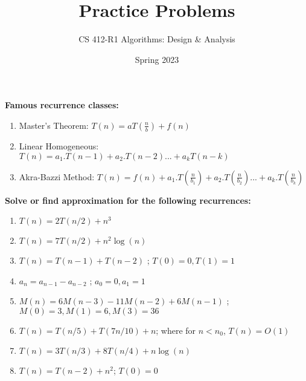 \documentclass{article}
\title{Practice Problems}
\author{CS 412-R1 Algorithms: Design \& Analysis}
\date{Spring 2023}
\begin{document}
\maketitle

\noindent \textbf{Famous recurrence classes:}
\begin{enumerate}
    \item Master's Theorem: $\displaystyle T(n) = aT\left(\frac{n}{b}\right) + f(n)$
    \item Linear Homogeneous: $T(n) = a_1.T(n-1)+a_2.T(n-2)...+a_kT(n-k)$
    \item Akra-Bazzi Method: $\displaystyle T(n) = f(n) + a_1.T\left(\frac{n}{b_1}\right) + a_2.T\left(\frac{n}{b_2}\right)... + a_k.T\left(\frac{n}{b_k}\right)$
\end{enumerate}


\noindent \textbf{Solve or find approximation for the following recurrences:}
\begin{enumerate}
    \item $T(n) = 2T(n/2) + n^3$
    \item $T(n) = 7T(n/2) + n^2\log(n)$
    \item $T(n) = T(n-1) + T(n-2)$ ; $T(0)=0, T(1)=1$
    \item $a_n = a_{n-1} - a_{n-2}$ ; $a_0=0, a_1=1$
    \item $M(n) = 6M(n-3) - 11M(n-2) + 6M(n-1)$ ; \\$M(0)=3, M(1)=6, M(3)=36$
    \item $T(n) = T(n/5) + T(7n/10) + n$; where for $n<n_0$, $T(n)=O(1)$
    \item $T(n) = 3T(n/3) + 8T(n/4) + n\log(n)$
    \item $T(n) = T(n-2) + n^2$; $T(0)=0$
\end{enumerate}
\end{document}
